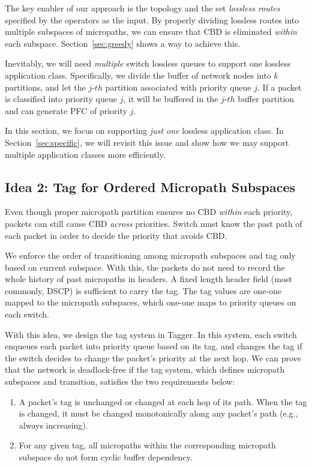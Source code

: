 The key enabler of our approach is the topology and the set {\em lossless routes} specified by the operators
as the input. By properly dividing lossless routes into multiple subspaces of micropaths, we can
ensure that CBD is eliminated {\em within} each subspace. Section~\ref{sec:greedy} shows a way to achieve this.

Inevitably, we will need {\em multiple} switch lossless queues to support one lossless application class.
Specifically, we divide the buffer of network nodes into $k$ partitions, and let the $j$-$th$ partition associated 
with priority queue $j$. If a packet is classified into priority queue $j$, it will be buffered in the $j$-$th$ buffer 
partition and can generate PFC of priority $j$. 

In this section, we focus on supporting {\em just one} lossless application class. In Section~\ref{sec:specific}, we will revisit 
this issue and show how we may support multiple application classes more efficiently.

\subsection{Idea 2: Tag for Ordered Micropath Subspaces}

Even though proper micropath partition ensures no CBD {\em within} each priority, packets can still cause CBD
{\em across} priorities. Switch must know the past path of each packet in order to decide the priority that avoids CBD.

We enforce the order of transitioning among micropath subspaces and tag only based on current subspace.
With this, the packets do not need to record the whole history of past micropaths in headers. A fixed length 
header field (most commonly, DSCP) is sufficient to carry the tag. The tag values are one-one mapped to the micropath subspaces,
which one-one maps to priority queues on each switch. 

With this idea, we design the tag system in Tagger. In this system, each switch enqueues each packet into priority queue based
on its tag, and changes the tag if the switch decides to change the packet's priority at the next hop.
We can prove that the network is deadlock-free if the tag system, which defines micropath subspaces and transition, 
satisfies the two requirements below:

\begin{enumerate}

	\item A packet's tag is unchanged or changed at each hop of its path. When the tag is changed, it must be changed monotonically 
	along any packet's path (e.g., always increasing).

	\item For any given tag, all micropaths within the corresponding micropath subspace do not form cyclic buffer dependency.

\end{enumerate}

